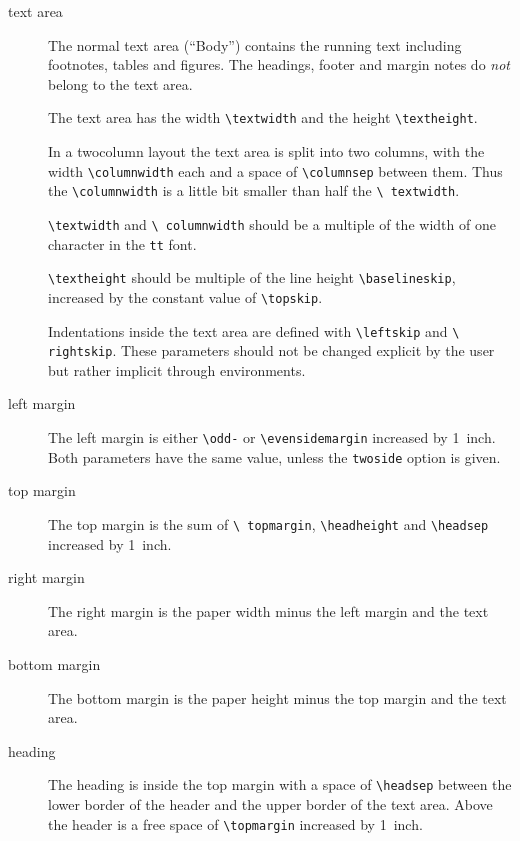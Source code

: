 \begin{description}

\item[text area]
	The normal text area (``Body'') contains the running text 
	including footnotes, tables and figures.  The headings, footer 
	and margin notes do \emph{not} belong to the text area.
        
	The text area has the width \texttt{\textbackslash textwidth} 
	and the height \texttt{\textbackslash text\-height}.
        
	In a twocolumn layout the text area is split into two 
	columns, with the width \texttt{\textbackslash columnwidth} 
	each and a space of \texttt{\textbackslash columnsep} between 
	them.  Thus the \texttt{\textbackslash columnwidth} is a 
	little bit smaller than half the \texttt{\textbackslash 
	textwidth}.
	
	\texttt{\textbackslash textwidth} and \texttt{\textbackslash 
	columnwidth} should be a multiple of the width of one 
	character in the \texttt{tt} font.
	
        \texttt{\textbackslash textheight} should be multiple of the 
        line height \texttt{\textbackslash baselineskip}, increased by 
        the constant value of \texttt{\textbackslash topskip}.
	
	Indentations inside the text area are defined with 
	\texttt{\textbackslash leftskip} and \texttt{\textbackslash 
	rightskip}.  These parameters should not be changed explicit 
	by the user but rather implicit through environments.
	
\item[left margin]
	The left margin is either \texttt{\textbackslash odd-} or 
	\texttt{\textbackslash evensidemargin} increased by 1~inch.  
	Both parameters have the same value, unless the 
	\texttt{twoside} option is given.

\item[top margin]
	The top margin is the sum of \texttt{\textbackslash 
	topmargin}, \texttt{\textbackslash headheight} and 
	\texttt{\textbackslash headsep} increased by 1~inch.

\item[right margin]
	The right margin is the paper width minus the left margin and 
	the text area.

\item[bottom margin]
	The bottom margin is the paper height minus the top margin and 
	the text area.
       
\item[heading]
	The heading is inside the top margin with a space of 
	\texttt{\textbackslash headsep} between the lower border of 
	the header and the upper border of the text area.  Above the 
	header is a free space of \texttt{\textbackslash topmargin} 
	increased by 1~inch.
      

\end{description}
